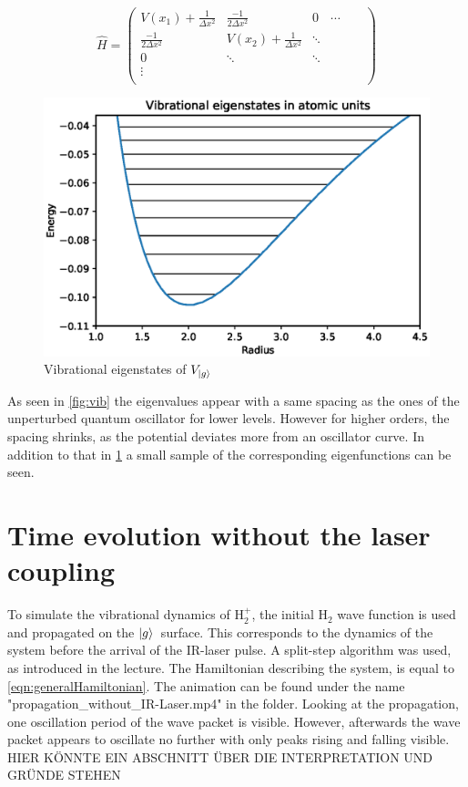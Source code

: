\documentclass[12pt]{article}
\newcommand{\gr}{$\ket{g}$}
\begin{document}
\begin{equation}\label{eqn:discresteHamiltonian}
    \hat H=\left({\begin{array}{cccccc}
   V(x_1)+\frac{1}{\Delta x^2} & \frac{-1}{2\Delta x^2} &0& \cdots & &\\
   \frac{-1}{2\Delta x^2} & V(x_2)+\frac{1}{\Delta x^2} & \ddots & & & \\
   0 &\ddots  &\ddots &&&\\
   \vdots&&&&&\\
  \end{array} } \right)
\end{equation}
\begin{figure}\label{fig:vibStates}
    \centering
    \includegraphics[width=1\textwidth]{vibEigenstates.eps}
    \caption{Vibrational eigenstates of $V_{\ket{g}}$ }
\end{figure}
As seen in \ref{fig:vib} the eigenvalues appear with a same spacing as the ones of the unperturbed quantum oscillator for lower levels. However for higher orders, the spacing shrinks, as the potential deviates more from an oscillator curve. In addition to that in \ref{fig:vibStates} a small sample of the corresponding eigenfunctions can be seen.



\section{Time evolution without the laser coupling}
To simulate the vibrational dynamics of H$_2^+$, the initial H$_2$ wave function is used and propagated on the \gr\ surface. This corresponds to the dynamics of the system before the arrival of the IR-laser pulse. A split-step algorithm was used, as introduced in the lecture. The Hamiltonian describing the system, is equal to \ref{eqn:generalHamiltonian}.
The animation can be found under the name "propagation\_without\_IR-Laser.mp4"
in the folder.
Looking at the propagation, one oscillation period of the wave packet is visible. However, afterwards the wave packet appears to oscillate no further with only peaks rising and falling visible.
HIER KÖNNTE EIN ABSCHNITT ÜBER DIE INTERPRETATION UND GRÜNDE STEHEN
\end{document}
